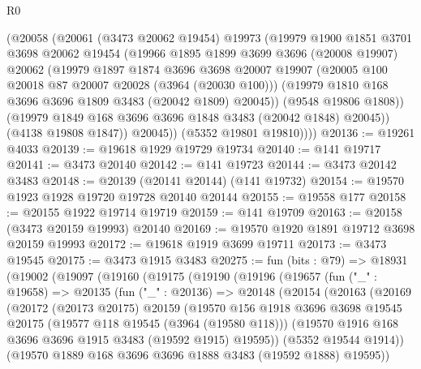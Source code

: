 \begin{lexlean}{R0}
\begin{coremodule}
            (@20058
              (@20061
                (@3473 @20062 @19454)
                @19973
                (@19979
                  @1900
                  @1851
                  @3701
                  @3698
                  @20062
                  @19454
                  (@19966
                    @1895
                    @1899
                    @3699
                    @3696
                    (@20008 @19907)
                    @20062
                    (@19979
                      @1897
                      @1874
                      @3696
                      @3698
                      @20007
                      @19907
                      (@20005 @100 @20018 @87 @20007 @20028 (@3964 (@20030 @100)))
                      (@19979 @1810 @168 @3696 @3696 @1809 @3483 (@20042 @1809) @20045))
                    (@9548 @19806 @1808))
                  (@19979 @1849 @168 @3696 @3696 @1848 @3483 (@20042 @1848) @20045))
                (@4138 @19808 @1847))
              @20045))
          (@5352 @19801 @19810))))
@20136 := @19261 @4033
@20139 := @19618 @1929 @19729 @19734
@20140 := @141 @19717
@20141 := @3473 @20140
@20142 := @141 @19723
@20144 := @3473 @20142 @3483
@20148 := @20139 (@20141 @20144) (@141 @19732)
@20154 := @19570 @1923 @1928 @19720 @19728 @20140 @20144
@20155 := @19558 @177
@20158 := @20155 @1922 @19714 @19719
@20159 := @141 @19709
@20163 := @20158 (@3473 @20159 @19993) @20140
@20169 := @19570 @1920 @1891 @19712 @3698 @20159 @19993
@20172 := @19618 @1919 @3699 @19711
@20173 := @3473 @19545
@20175 := @3473 @1915 @3483
@20275 := fun (bits : @79) =>
  @18931
    (@19002
      (@19097
        (@19160
          (@19175
            (@19190
              (@19196
                (@19657
                  (fun ("_" : @19658) =>
                  @20135
                    (fun ("_" : @20136) =>
                    @20148
                      (@20154
                        (@20163
                          (@20169
                            (@20172
                              (@20173 @20175)
                              @20159
                              (@19570
                                @156
                                @1918
                                @3696
                                @3698
                                @19545
                                @20175
                                (@19577 @118 @19545 (@3964 (@19580 @118)))
                                (@19570 @1916 @168 @3696 @3696 @1915 @3483 (@19592 @1915) @19595))
                              (@5352 @19544 @1914))
                            (@19570 @1889 @168 @3696 @3696 @1888 @3483 (@19592 @1888) @19595))

\end{coremodule}
\end{lexlean}
